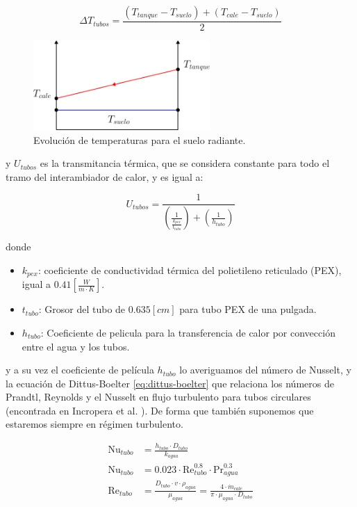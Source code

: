 \begin{equation} \label{eq:mean_delta_T}
	\Delta T_{tubos} = \frac{(T_{tanque} - T_{suelo}) + (T_{cale} - T_{suelo})}{2}
\end{equation}

\begin{figure}[h] \centering
	\centering
	\includegraphics[width=0.6\textwidth]{./capitulos/resultados_discusion/images/floor_temperatures.png}
	\caption{Evolución de temperaturas para el suelo radiante.}
	\label{fig:floor_temperatures}
\end{figure}

y $U_{tubos}$ es la transmitancia térmica, que se considera constante para todo
el tramo del interambiador de calor, y es igual a:

\begin{equation}
	U_{tubos} = \frac{1}{\left( \frac{1}{\frac{k_{pex}}{t_{tubo}}} \right) + \left( \frac{1}{h_{tubo}} \right)}
\end{equation}

donde

\begin{itemize}
	\item $k_{pex}$: coeficiente de conductividad térmica del polietileno reticulado (PEX), igual a $0.41\left[ \frac{W}{m \cdot K} \right]$.
	\item $t_{tubo}$: Grosor del tubo de $0.635[cm]$ para tubo PEX de una pulgada.
	\item $h_{tubo}$: Coeficiente de pelicula para la transferencia de calor por convección entre el agua y los tubos.
\end{itemize}

y a su vez el coeficiente de película $h_{tubo}$ lo averiguamos del número de
Nusselt, y la ecuación de Dittus-Boelter \eqref{eq:dittus-boelter} que
relaciona los números de Prandtl, Reynolds y el Nusselt en flujo turbulento
para tubos circulares (encontrada en Incropera et al.
\cite{incropera1996fundamentals}). De forma que también suponemos que estaremos
siempre en régimen turbulento.

\begin{align}
	\text{Nu}_{tubo} & = \frac{h_{tubo} \cdot D_{tubo}}{k_{agua}}                                                                                   \\
	\text{Nu}_{tubo} & = 0.023 \cdot \text{Re}_{tubo}^{0.8} \cdot \text{Pr}_{agua}^{0.3}     \label{eq:dittus-boelter}                              \\
	\text{Re}_{tubo} & = \frac{D_{tubo} \cdot v \cdot \rho_{agua}}{\mu_{agua}} = \frac{4 \cdot \dot{m}_{cale}}{\pi \cdot \mu_{agua} \cdot D_{tubo}}
\end{align}

